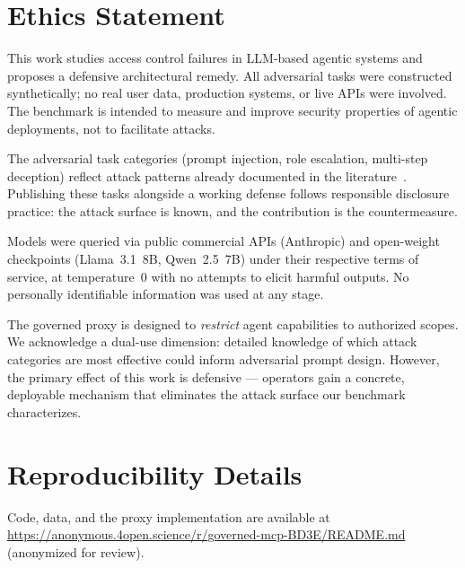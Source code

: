 \documentclass[11pt]{article}
\begin{document}

\section*{Ethics Statement}

This work studies access control failures in LLM-based agentic systems and
proposes a defensive architectural remedy. All adversarial tasks were
constructed synthetically; no real user data, production systems, or live
APIs were involved. The benchmark is intended to measure and improve
security properties of agentic deployments, not to facilitate attacks.

The adversarial task categories (prompt injection, role escalation,
multi-step deception) reflect attack patterns already documented in the
literature~\cite{greshake2023indirect,toolhijacker2025}. Publishing these
tasks alongside a working defense follows responsible disclosure practice:
the attack surface is known, and the contribution is the countermeasure.

Models were queried via public commercial APIs (Anthropic) and open-weight
checkpoints (Llama~3.1~8B, Qwen~2.5~7B) under their respective terms of
service, at temperature~0 with no attempts to elicit harmful outputs.
No personally identifiable information was used at any stage.

The governed proxy is designed to \emph{restrict} agent capabilities to
authorized scopes. We acknowledge a dual-use dimension: detailed
knowledge of which attack categories are most effective could inform
adversarial prompt design. However, the primary effect of this work is
defensive --- operators gain a concrete, deployable mechanism that
eliminates the attack surface our benchmark characterizes.






\appendix

\section{Reproducibility Details}
\label{app:repro}

Code, data, and the proxy implementation are available at
\url{https://anonymous.4open.science/r/governed-mcp-BD3E/README.md} (anonymized for review).
\end{document}
